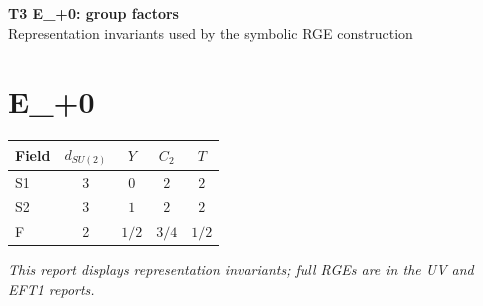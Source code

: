 \documentclass[10pt,a4paper]{article}
\begin{document}
\begin{center}
{\Large\bfseries T3 E\_+0: group factors}\\[4pt]
Representation invariants used by the symbolic RGE construction
\end{center}
\bigskip
\section*{E\_+0}
\begin{longtable}{@{}lcccc@{}}
\toprule Field & $d_{SU(2)}$ & $Y$ & $C_2$ & $T$ \\
\midrule
S1 & 3 & $0$ & $2$ & $2$ \\
S2 & 3 & $1$ & $2$ & $2$ \\
F & 2 & $1/2$ & $3/4$ & $1/2$ \\
\bottomrule
\end{longtable}
\emph{This report displays representation invariants; full RGEs are in the UV and EFT1 reports.}
\end{document}

